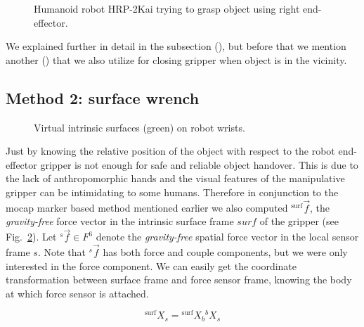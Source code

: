 \begin{figure}[ht]
	\caption{Humanoid robot HRP-2Kai trying to grasp object using right end-effector.}
	\label{fig:markerEf1}
\end{figure} 

We explained further in detail in the subsection (), but before that we mention another () that we also utilize for closing gripper when object is in the vicinity.



\subsection{Method 2: surface wrench}\label{surface wrench}

\begin{figure}[ht]
	\caption{Virtual intrinsic surfaces (green) on robot wrists.}
	\label{fig:wrist-surface2}
\end{figure}


Just by knowing the relative position of the object with respect to the robot end-effector gripper is not enough for safe and reliable object handover. This is due to the lack of anthropomorphic hands and the visual features of the manipulative gripper can be intimidating to some humans. Therefore in conjunction to the mocap marker based method mentioned earlier we also computed ${}^\text{surf}\vec{f}$, the \textit{gravity-free} force vector in the intrinsic surface frame $surf$ of the gripper (see Fig.~\ref{fig:wrist-surface2}). Let ${}^s\vec{f}\in F^6$ denote the \textit{gravity-free} spatial force vector in the local sensor frame $s$. Note that ${}^s\vec{f}$ has both force and couple components, but we were only interested in the force component. We can easily get the coordinate transformation between surface frame and force sensor frame, knowing the body at which force sensor is attached.

\begin{equation}\label{X_s_surf}
    {}^\text{surf}X_{s} = {}^\text{surf}X_{b} {}^{b}X_s
\end{equation}

